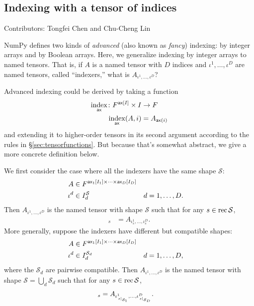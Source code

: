 \subsection{Indexing with a tensor of indices}

Contributors: Tongfei Chen and Chu-Cheng Lin

NumPy defines two kinds of \emph{advanced} (also known as \emph{fancy}) indexing: by integer arrays and by Boolean arrays. Here, we generalize indexing by integer arrays to named tensors. That is, if $A$ is a named tensor with $D$ indices and $\iota^1, \ldots, \iota^D$ are named tensors, called ``indexers,'' what is $A_{\iota^1, \ldots, \iota^D}$?

Advanced indexing could be derived by taking a function
\begin{align*}
  \mathop{\underset{\mathsf{ax}}{\mathrm{index}}} \colon F^{\mathsf{ax}[I]} \times I &\rightarrow F \\
  \mathop{\underset{\mathsf{ax}}{\mathrm{index}}}(A, i) &= A_{\mathsf{ax}(i)}
\end{align*}
and extending it to higher-order tensors in its second argument according to the rules in \S\ref{sec:tensorfunctions}. But because that's somewhat abstract, we give a more concrete definition below.

We first consider the case where all the indexers have the same shape $\mathcal{S}$:
\begin{align*}
  A &\in F^{\mathsf{ax_\text{$1$}}[I_1] \times \cdots \times \mathsf{ax_\text{$D$}}[I_D]} \\
  \iota^d &\in I_d^{\mathcal{S}} & d &= 1, \ldots, D.
\end{align*}
Then $A_{\iota^1, \ldots, \iota^D}$ is the named tensor with shape $\mathcal{S}$ such that for any $s \in \operatorname{rec}{\mathcal{S}}$,
\begin{align*}
  [A_{\iota^1, \ldots, \iota^D}]_s &= A_{\iota^1_s, \ldots, \iota^D_s}.
\end{align*}
More generally, suppose the indexers have different but compatible shapes:
\begin{align*}
  A &\in F^{\mathsf{ax_\text{$1$}}[I_1] \times \cdots \times \mathsf{ax_\text{$D$}}[I_D]} \\
  \iota^d &\in I_d^{\mathcal{S}_d} & d &= 1, \ldots, D,
\end{align*}
where the $\mathcal{S}_d$ are pairwise compatible. Then $A_{\iota^1, \ldots, \iota^D}$ is the named tensor with shape $\mathcal{S} = \bigcup_d \mathcal{S}_d$ such that for any $s \in \operatorname{rec}{\mathcal{S}}$,
\begin{align*}
  [A_{\iota^1, \ldots, \iota^D}]_s &= A_{\iota^1_{\restrict{s}{\mathcal{S}_1}}, \ldots, \iota^D_{\restrict{s}{\mathcal{S}_D}}}.
\end{align*}


